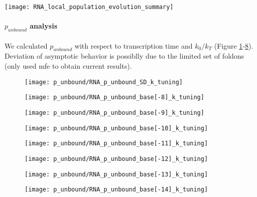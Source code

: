\documentclass[11pt, a4paper]{article}
\begin{document}
\begin{figure*}[tph]
\centering
\texttt{[image: RNA\_local\_population\_evolution\_summary]}
\caption[Population dynamics]{\small Population dynamics of four structrual motifs during co-transcriptional folding.}
\label{fig:populations}
\end{figure*}

\paragraph{$p_{unbound}$ analysis} We calculated $p_{unbound}$ with respect to transcription time and $k_0/k_T$ (Figure \ref{fig:RNA_p_unbound_SD_k_tuning}-\ref{fig:RNA_p_unbound_base[-14]_k_tuning}). Deviation of asymptotic behavior is possiblly due to the limited set of foldons (only used mfe to obtain current results).

\begin{figure}
	\centering
	\texttt{[image: p\_unbound/RNA\_p\_unbound\_SD\_k\_tuning]}
	\caption{}
	\label{fig:RNA_p_unbound_SD_k_tuning}
\end{figure}
\begin{figure}
\centering
\texttt{[image: p\_unbound/RNA\_p\_unbound\_base[-8]\_k\_tuning]}
\caption{}
\label{fig:RNA_p_unbound_base[-8]_k_tuning}
\end{figure}
\begin{figure}
\centering
\texttt{[image: p\_unbound/RNA\_p\_unbound\_base[-9]\_k\_tuning]}
\caption{}
\label{fig:RNA_p_unbound_base[-9]_k_tuning}
\end{figure}
\begin{figure}
\centering
\texttt{[image: p\_unbound/RNA\_p\_unbound\_base[-10]\_k\_tuning]}
\caption{}
\label{fig:RNA_p_unbound_base[-10]_k_tuning}
\end{figure}
\begin{figure}
\centering
\texttt{[image: p\_unbound/RNA\_p\_unbound\_base[-11]\_k\_tuning]}
\caption{}
\label{fig:RNA_p_unbound_base[-11]_k_tuning}
\end{figure}
\begin{figure}
\centering
\texttt{[image: p\_unbound/RNA\_p\_unbound\_base[-12]\_k\_tuning]}
\caption{}
\label{fig:RNA_p_unbound_base[-12]_k_tuning}
\end{figure}
\begin{figure}
\centering
\texttt{[image: p\_unbound/RNA\_p\_unbound\_base[-13]\_k\_tuning]}
\caption{}
\label{fig:RNA_p_unbound_base[-13]_k_tuning}
\end{figure}
\begin{figure}
\centering
\texttt{[image: p\_unbound/RNA\_p\_unbound\_base[-14]\_k\_tuning]}
\caption{}
\label{fig:RNA_p_unbound_base[-14]_k_tuning}
\end{figure}
\end{document}
